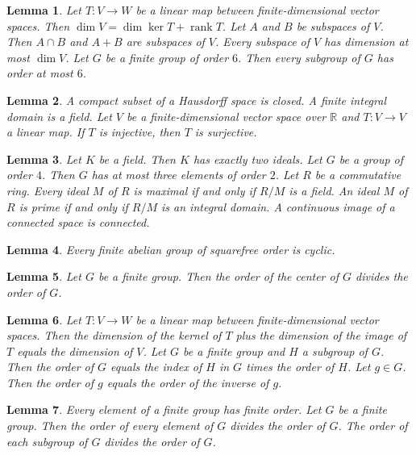 \documentclass{article}
\newtheorem{lemma}{Lemma}
\begin{document}
\begin{lemma}\label{linear-maps-between}
Let $T\colon V\to W$ be a linear map between finite-dimensional vector spaces. Then $\dim V=\dim\ker T+\operatorname{rank}T$. Let $A$ and $B$ be subspaces of $V$. Then $A\cap B$ and $A+B$ are subspaces of $V$. Every subspace of $V$ has dimension at most $\dim V$. Let $G$ be a finite group of order $6$. Then every subgroup of $G$ has order at most $6$.
\end{lemma}

\begin{lemma}\label{generic-subjects}
A compact subset of a Hausdorff space is closed. A finite integral domain is a field. Let $V$ be a finite-dimensional vector space over $\mathbb{R}$ and $T\colon V\to V$ a linear map. If $T$ is injective, then $T$ is surjective.
\end{lemma}

\begin{lemma}\label{counting-and-scope}
Let $K$ be a field. Then $K$ has exactly two ideals. Let $G$ be a group of order $4$. Then $G$ has at most three elements of order $2$. Let $R$ be a commutative ring. Every ideal $M$ of $R$ is maximal if and only if $R/M$ is a field. An ideal $M$ of $R$ is prime if and only if $R/M$ is an integral domain. A continuous image of a connected space is connected.
\end{lemma}

\begin{lemma}\label{squarefree-order}
Every finite abelian group of squarefree order is cyclic.
\end{lemma}

\begin{lemma}\label{order-of-center}
Let $G$ be a finite group. Then the order of the center of $G$ divides the order of $G$.
\end{lemma}

\begin{lemma}\label{sums-of-notions}
Let $T\colon V\to W$ be a linear map between finite-dimensional vector spaces. Then the dimension of the kernel of $T$ plus the dimension of the image of $T$ equals the dimension of $V$. Let $G$ be a finite group and $H$ a subgroup of $G$. Then the order of $G$ equals the index of $H$ in $G$ times the order of $H$. Let $g\in G$. Then the order of $g$ equals the order of the inverse of $g$.
\end{lemma}

\begin{lemma}\label{order-of-every}
Every element of a finite group has finite order. Let $G$ be a finite group. Then the order of every element of $G$ divides the order of $G$. The order of each subgroup of $G$ divides the order of $G$.
\end{lemma}
\end{document}

